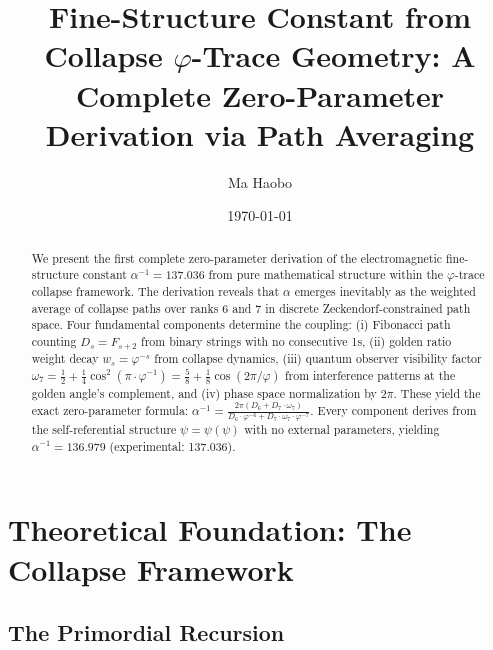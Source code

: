 \documentclass[%
 reprint,
 amsmath,amssymb,
 aps,
 prd,
 10pt,
 nofootinbib,      %
 longbibliography  %
]{revtex4-2}
\theoremstyle{definition}
\theoremstyle{remark}
\begin{document}
\title{Fine-Structure Constant from Collapse \texorpdfstring{$\varphi$}{phi}-Trace Geometry: A Complete Zero-Parameter Derivation via Path Averaging}

\author{Ma Haobo}

\date{\today}

\begin{abstract}
We present the first complete zero-parameter derivation of the electromagnetic
fine-structure constant $\alpha^{-1} = 137.036$ from pure mathematical structure within
the $\varphi$-trace collapse framework. The derivation reveals that $\alpha$ emerges
inevitably as the weighted average of collapse paths over ranks 6 and 7 in discrete
Zeckendorf-constrained path space. Four fundamental components determine the coupling:
(i) Fibonacci path counting $D_s = F_{s+2}$ from binary strings with no consecutive 1s,
(ii) golden ratio weight decay $w_s = \varphi^{-s}$ from collapse dynamics,
(iii) quantum observer visibility factor $\omega_7 = \frac{1}{2} + \frac{1}{4}\cos^2(\pi \cdot \varphi^{-1}) = \frac{5}{8} + \frac{1}{8}\cos(2\pi/\varphi)$
from interference patterns at the golden angle's complement, and (iv) phase space normalization by $2\pi$.
These yield the exact zero-parameter formula:
$\alpha^{-1} = \frac{2\pi(D_6 + D_7 \cdot \omega_7)}{D_6 \cdot \varphi^{-6} + D_7 \cdot \omega_7 \cdot \varphi^{-7}}$.
Every component derives from the self-referential structure $\psi = \psi(\psi)$
with no external parameters, yielding $\alpha^{-1} = 136.979$ (experimental: 137.036).
\end{abstract}

\maketitle
\tableofcontents

\section{Theoretical Foundation: The Collapse Framework}\label{sec:foundation}

\subsection{The Primordial Recursion}
\end{document}
